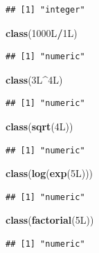 \documentclass[]{book}
\newenvironment{Shaded}{\begin{snugshade}}{\end{snugshade}}
\newcommand{\KeywordTok}[1]{\textcolor[rgb]{0.13,0.29,0.53}{\textbf{#1}}}
\newcommand{\NormalTok}[1]{#1}
\newcommand{\OperatorTok}[1]{\textcolor[rgb]{0.81,0.36,0.00}{\textbf{#1}}}
\begin{document}
\begin{verbatim}
## [1] "integer"
\end{verbatim}

\begin{Shaded}
\begin{Highlighting}[]
\KeywordTok{class}\NormalTok{(1000L}\OperatorTok{/}\NormalTok{1L)}
\end{Highlighting}
\end{Shaded}

\begin{verbatim}
## [1] "numeric"
\end{verbatim}

\begin{Shaded}
\begin{Highlighting}[]
\KeywordTok{class}\NormalTok{(3L}\OperatorTok{^}\NormalTok{4L)}
\end{Highlighting}
\end{Shaded}

\begin{verbatim}
## [1] "numeric"
\end{verbatim}

\begin{Shaded}
\begin{Highlighting}[]
\KeywordTok{class}\NormalTok{(}\KeywordTok{sqrt}\NormalTok{(4L))}
\end{Highlighting}
\end{Shaded}

\begin{verbatim}
## [1] "numeric"
\end{verbatim}

\begin{Shaded}
\begin{Highlighting}[]
\KeywordTok{class}\NormalTok{(}\KeywordTok{log}\NormalTok{(}\KeywordTok{exp}\NormalTok{(5L)))}
\end{Highlighting}
\end{Shaded}

\begin{verbatim}
## [1] "numeric"
\end{verbatim}

\begin{Shaded}
\begin{Highlighting}[]
\KeywordTok{class}\NormalTok{(}\KeywordTok{factorial}\NormalTok{(5L))}
\end{Highlighting}
\end{Shaded}

\begin{verbatim}
## [1] "numeric"
\end{verbatim}
\end{document}
